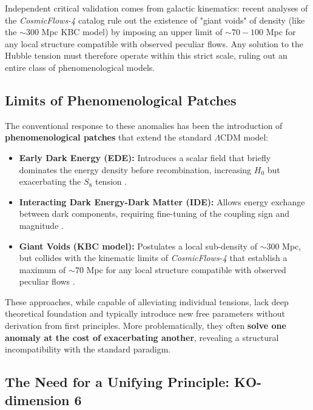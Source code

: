 \documentclass[11pt, a4paper]{article}
\theoremstyle{plain}
\theoremstyle{definition}
\begin{document}
Independent critical validation comes from galactic kinematics: recent analyses of the \textit{CosmicFlows-4} catalog \cite{Mazurenko2024} rule out the existence of "giant voids" of density (like the $\sim 300$ Mpc KBC model) by imposing an upper limit of $\sim 70-100$ Mpc for any local structure compatible with observed peculiar flows. Any solution to the Hubble tension must therefore operate within this strict scale, ruling out an entire class of phenomenological models.

\subsection{Limits of Phenomenological Patches}

The conventional response to these anomalies has been the introduction of \textbf{phenomenological patches} that extend the standard $\Lambda$CDM model:

\begin{itemize}
    \item \textbf{Early Dark Energy (EDE):} Introduces a scalar field that briefly dominates the energy density before recombination, increasing $H_0$ but exacerbating the $S_8$ tension \cite{Poulin2019}.
    
    \item \textbf{Interacting Dark Energy-Dark Matter (IDE):} Allows energy exchange between dark components, requiring fine-tuning of the coupling sign and magnitude \cite{DiValentino2020}.
    
    \item \textbf{Giant Voids (KBC model):} Postulates a local sub-density of $\sim 300$ Mpc, but collides with the kinematic limits of \textit{CosmicFlows-4} that establish a maximum of $\sim 70$ Mpc for any local structure compatible with observed peculiar flows \cite{Mazurenko2024}.
\end{itemize}

These approaches, while capable of alleviating individual tensions, lack deep theoretical foundation and typically introduce new free parameters without derivation from first principles. More problematically, they often \textbf{solve one anomaly at the cost of exacerbating another}, revealing a structural incompatibility with the standard paradigm.

\subsection{The Need for a Unifying Principle: KO-dimension 6}
\end{document}

